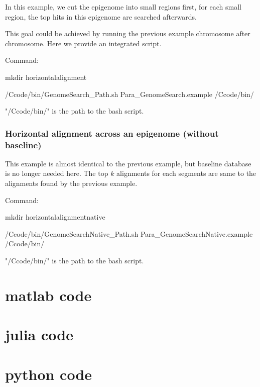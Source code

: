 \documentclass[a4paper]{article}
\begin{document}
\begin{CJK*}{UTF8}{kai}
In this example, we cut the epigenome into small regions first, for each small region, the top hits in this epigenome are searched afterwards. 

This goal could be achieved by running the previous example chromosome after chromosome. Here we provide an integrated script.

Command: 

mkdir horizontalalignment

/Ccode/bin/GenomeSearch\_Path.sh Para\_GenomeSearch.example /Ccode/bin/

"/Ccode/bin/" is the path to the bash script.

\subsubsection{Horizontal alignment across an epigenome (without baseline)}

This example is almost identical to the previous example, but baseline database is no longer needed here. The top $k$ alignments for each segments are same to the alignments found by the previous example.

Command: 

mkdir horizontalalignmentnative

/Ccode/bin/GenomeSearchNative\_Path.sh Para\_GenomeSearchNative.example /Ccode/bin/

"/Ccode/bin/" is the path to the bash script.

\section{matlab code}

\section{julia code}

\section{python code}

\end{CJK*}
\end{document}
